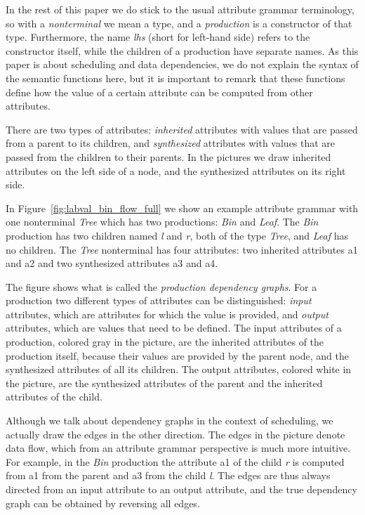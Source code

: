 \documentclass{llncs}
\newcommand{\figref}[1]{Figure~\ref{#1}}
\begin{document}
In the rest of this paper we do stick to the usual attribute grammar terminology, so with a \emph{nonterminal} we mean a type, and a \emph{production} is a constructor of that type. Furthermore, the name \emph{lhs} (short for left-hand side) refers to the constructor itself, while the children of a production have separate names. As this paper is about scheduling and data dependencies, we do not explain the syntax of the semantic functions here, but it is important to remark that these functions define how the value of a certain attribute can be computed from other attributes.

There are two types of attributes: \emph{inherited} attributes with values that are passed from a parent to its children, and \emph{synthesized} attributes with values that are passed from the children to their parents. In the pictures we draw inherited attributes on the left side of a node, and the synthesized attributes on its right side.


In \figref{fig:labval_bin_flow_full} we show an example attribute grammar with one nonterminal \emph{Tree} which has two productions: \emph{Bin} and \emph{Leaf}. The \emph{Bin} production has two children named \emph{l} and \emph{r}, both of the type \emph{Tree}, and \emph{Leaf} has no children. The \emph{Tree} nonterminal has four attributes: two inherited attributes a1 and a2 and two synthesized attributes a3 and a4.

The figure shows what is called the \emph{production dependency graphs}. For a production two different types of attributes can be distinguished: \emph{input} attributes, which are attributes for which the value is provided, and \emph{output} attributes, which are values that need to be defined. The input attributes of a production, colored gray in the picture, are the inherited attributes of the production itself, because their values are provided by the parent node, and the synthesized attributes of all its children. The output attributes, colored white in the picture, are the synthesized attributes of the parent and the inherited attributes of the child.

Although we talk about dependency graphs in the context of scheduling, we actually draw the edges in the other direction. The edges in the picture denote data flow, which from an attribute grammar perspective is much more intuitive. For example, in the \emph{Bin} production the attribute a1 of the child \emph{r} is computed from a1 from the parent and a3 from the child \emph{l}. The edges are thus always directed from an input attribute to an output attribute, and the true dependency graph can be obtained by reversing all edges.
\end{document}
